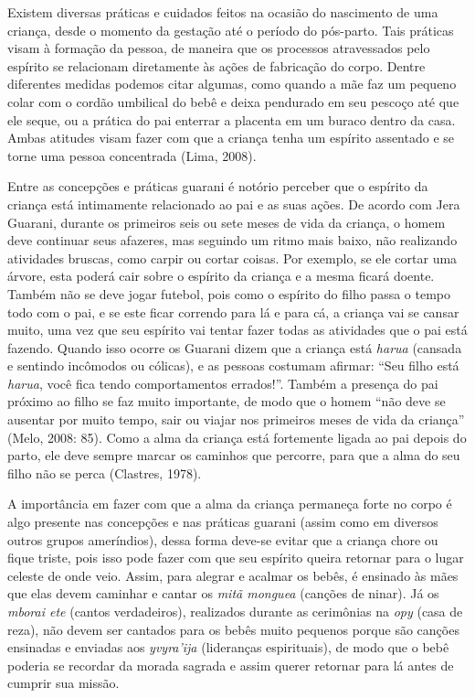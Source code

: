 Existem diversas práticas e cuidados feitos na ocasião do nascimento de
uma criança, desde o momento da gestação até o período do pós-parto.
Tais práticas visam à formação da pessoa, de maneira que os processos
atravessados pelo espírito se relacionam diretamente às ações de
fabricação do corpo. Dentre diferentes medidas podemos citar algumas,
como quando a mãe faz um pequeno colar com o cordão umbilical do bebê e
deixa pendurado em seu pescoço até que ele seque, ou a prática do pai
enterrar a placenta em um buraco dentro da casa. Ambas atitudes visam
fazer com que a criança tenha um espírito assentado e se torne uma
pessoa concentrada (Lima, 2008).

Entre as concepções e práticas guarani é notório perceber que o espírito
da criança está intimamente relacionado ao pai e as suas ações. De
acordo com Jera Guarani, durante os primeiros seis ou sete meses de vida
da criança, o homem deve continuar seus afazeres, mas seguindo um ritmo
mais baixo, não realizando atividades bruscas, como carpir ou cortar
coisas. Por exemplo, se ele cortar uma árvore, esta poderá cair sobre o
espírito da criança e a mesma ficará doente. Também não se deve jogar
futebol, pois como o espírito do filho passa o tempo todo com o pai, e
se este ficar correndo para lá e para cá, a criança vai se cansar muito,
uma vez que seu espírito vai tentar fazer todas as atividades que o pai
está fazendo. Quando isso ocorre os Guarani dizem que a criança está
\emph{harua} (cansada e sentindo incômodos ou cólicas), e as pessoas
costumam afirmar: ``Seu filho está \emph{harua}, você fica tendo
comportamentos errados!''. Também a presença do pai próximo ao filho se
faz muito importante, de modo que o homem ``não deve se ausentar por
muito tempo, sair ou viajar nos primeiros meses de vida da criança''
(Melo, 2008: 85). Como a alma da criança está fortemente ligada ao pai
depois do parto, ele deve sempre marcar os caminhos que percorre, para
que a alma do seu filho não se perca (Clastres, 1978).

A importância em fazer com que a alma da criança permaneça forte no
corpo é algo presente nas concepções e nas práticas guarani (assim como
em diversos outros grupos ameríndios), dessa forma deve-se evitar que a
criança chore ou fique triste, pois isso pode fazer com que seu espírito
queira retornar para o lugar celeste de onde veio. Assim, para alegrar e
acalmar os bebês, é ensinado às mães que elas devem caminhar e cantar os
\emph{mitã monguea} (canções de ninar). Já os \emph{mborai ete} (cantos
verdadeiros), realizados durante as cerimônias na \emph{opy} (casa de
reza), não devem ser cantados para os bebês muito pequenos porque são
canções ensinadas e enviadas aos \emph{yvyra'ija} (lideranças
espirituais), de modo que o bebê poderia se recordar da morada sagrada e
assim querer retornar para lá antes de cumprir sua missão.

